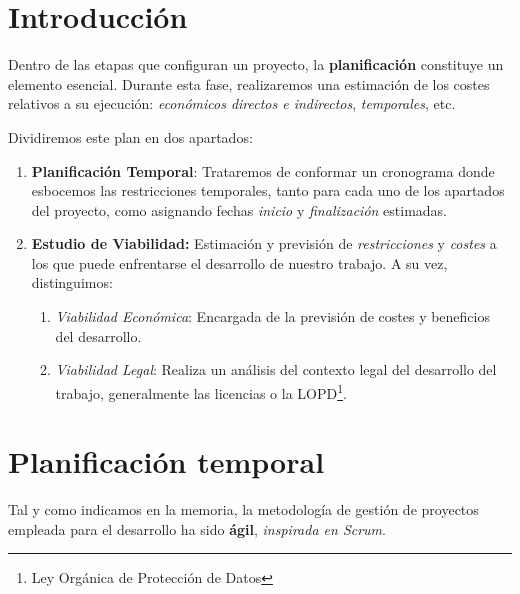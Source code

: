 
\section{Introducción}

Dentro de las etapas que configuran un proyecto, la \textbf{planificación} constituye un elemento esencial. Durante esta fase, realizaremos una estimación de los costes relativos a su ejecución: \textit{económicos directos e indirectos}, \textit{temporales}, etc.

Dividiremos este plan en dos apartados:
\begin{enumerate}
    \item \textbf{Planificación Temporal}: Trataremos de conformar un cronograma donde esbocemos las restricciones temporales, tanto para cada uno de los apartados del proyecto, como asignando fechas \textit{inicio} y \textit{finalización} estimadas.

    \item \textbf{Estudio de Viabilidad:} Estimación y previsión de \textit{restricciones} y \textit{costes} a los que puede enfrentarse el desarrollo de nuestro trabajo. A su vez, distinguimos:
\begin{enumerate}
        \item \textit{Viabilidad Económica}: Encargada de la previsión de costes y beneficios del desarrollo.

        \item \textit{Viabilidad Legal}: Realiza un análisis del contexto legal del desarrollo del trabajo, generalmente las licencias o la LOPD\footnote{Ley Orgánica de Protección de Datos}.
    \end{enumerate}
\end{enumerate}

\section{Planificación temporal}

Tal y como indicamos en la memoria, la metodología de gestión de proyectos empleada para el desarrollo ha sido \textbf{ágil}, \textit{inspirada en Scrum}\cite{SaezHurtado2021ComoUtilizarla}.

